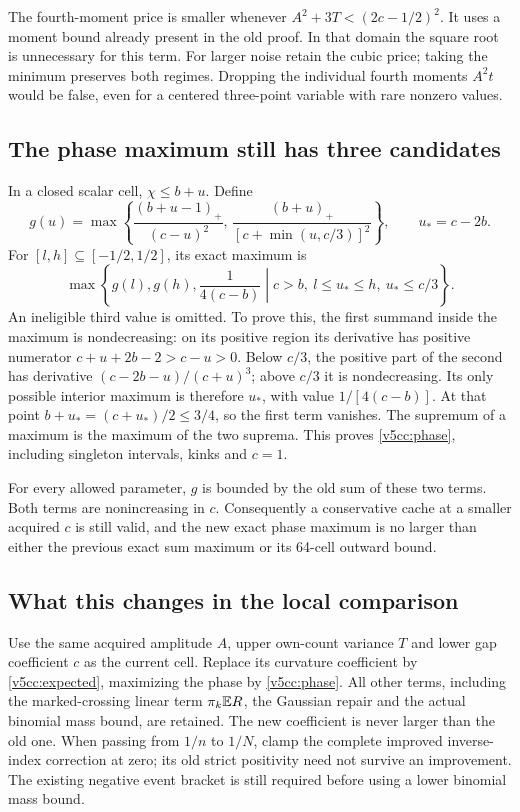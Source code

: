 The fourth-moment price is smaller whenever
$A^2+3T<(2c-1/2)^2$. It uses a moment bound already present in the
old proof. In that domain the square root is unnecessary for this term.
For larger noise retain the cubic price; taking the minimum preserves
both regimes. Dropping the individual fourth moments $A^2t$ would be
false, even for a centered three-point variable with rare nonzero values.

\subsection{The phase maximum still has three candidates}

In a closed scalar cell, $\chi\le b+u$. Define
\[
 g(u)=\max\left\{
 \frac{(b+u-1)_+}{(c-u)^2},\,
 \frac{(b+u)_+}{[c+\min(u,c/3)]^2}\right\},
 \qquad u_*=c-2b.
\]
For $[l,h]\subseteq[-1/2,1/2]$, its exact maximum is
\begin{equation}\label{v5cc:phase}
 \max\left\{g(l),g(h),
 \left.\frac1{4(c-b)}\;\right|\;
 c>b,\ l\le u_*\le h,\ u_*\le c/3\right\}.
\end{equation}
An ineligible third value is omitted. To prove this, the first summand
inside the maximum is nondecreasing: on its positive region its derivative
has positive numerator $c+u+2b-2>c-u>0$.
Below $c/3$, the positive part of the second has derivative
$(c-2b-u)/(c+u)^3$; above $c/3$ it is nondecreasing.
Its only possible interior maximum is therefore $u_*$, with value
$1/[4(c-b)]$. At that point $b+u_*=(c+u_*)/2\le3/4$, so the first
term vanishes. The supremum of a maximum is the maximum of the two
suprema. This proves \eqref{v5cc:phase}, including singleton intervals,
kinks and $c=1$.

For every allowed parameter, $g$ is bounded by the old sum of these two
terms. Both terms are nonincreasing in $c$. Consequently a conservative
cache at a smaller acquired $c$ is still valid, and the new exact phase
maximum is no larger than either the previous exact sum maximum or its
64-cell outward bound.

\subsection{What this changes in the local comparison}

Use the same acquired amplitude $A$, upper own-count variance $T$ and
lower gap coefficient $c$ as the current cell. Replace its curvature
coefficient by \eqref{v5cc:expected}, maximizing the phase by
\eqref{v5cc:phase}. All other terms, including the marked-crossing linear
term $\pi_k\mathbb E R$, the Gaussian repair and the actual binomial mass bound,
are retained. The new coefficient is never larger than the old one.
When passing from $1/n$ to $1/N$, clamp the complete improved inverse-index
correction at zero; its old strict positivity need not survive an improvement.
The existing negative event bracket is still required before using a lower
binomial mass bound.

